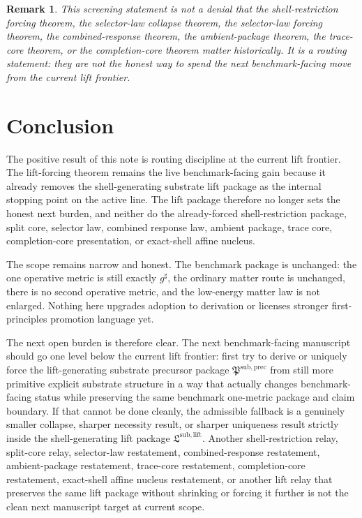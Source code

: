 \documentclass[11pt]{article}
\newcommand{\CompletedMetric}{g^{\sharp}}
\newcommand{\LiftPackage}{\mathfrak L^{\mathrm{sub,lift}}}
\newcommand{\PrecursorPackage}{\mathfrak P^{\mathrm{sub,prec}}}
\newtheorem{remark}{Remark}
\begin{document}
\begin{remark}
This screening statement is not a denial that the shell-restriction forcing theorem, the selector-law collapse theorem, the selector-law forcing theorem, the combined-response theorem, the ambient-package theorem, the trace-core theorem, or the completion-core theorem matter historically. It is a routing statement: they are not the honest way to spend the next benchmark-facing move from the current lift frontier.
\end{remark}

\section{Conclusion}

The positive result of this note is routing discipline at the current lift frontier. The lift-forcing theorem remains the live benchmark-facing gain because it already removes the shell-generating substrate lift package as the internal stopping point on the active line. The lift package therefore no longer sets the honest next burden, and neither do the already-forced shell-restriction package, split core, selector law, combined response law, ambient package, trace core, completion-core presentation, or exact-shell affine nucleus.

The scope remains narrow and honest. The benchmark package is unchanged: the one operative metric is still exactly \(\CompletedMetric\), the ordinary matter route is unchanged, there is no second operative metric, and the low-energy matter law is not enlarged. Nothing here upgrades adoption to derivation or licenses stronger first-principles promotion language yet.

The next open burden is therefore clear. The next benchmark-facing manuscript should go one level below the current lift frontier: first try to derive or uniquely force the lift-generating substrate precursor package \(\PrecursorPackage\) from still more primitive explicit substrate structure in a way that actually changes benchmark-facing status while preserving the same benchmark one-metric package and claim boundary. If that cannot be done cleanly, the admissible fallback is a genuinely smaller collapse, sharper necessity result, or sharper uniqueness result strictly inside the shell-generating lift package \(\LiftPackage\). Another shell-restriction relay, split-core relay, selector-law restatement, combined-response restatement, ambient-package restatement, trace-core restatement, completion-core restatement, exact-shell affine nucleus restatement, or another lift relay that preserves the same lift package without shrinking or forcing it further is not the clean next manuscript target at current scope.
\end{document}
